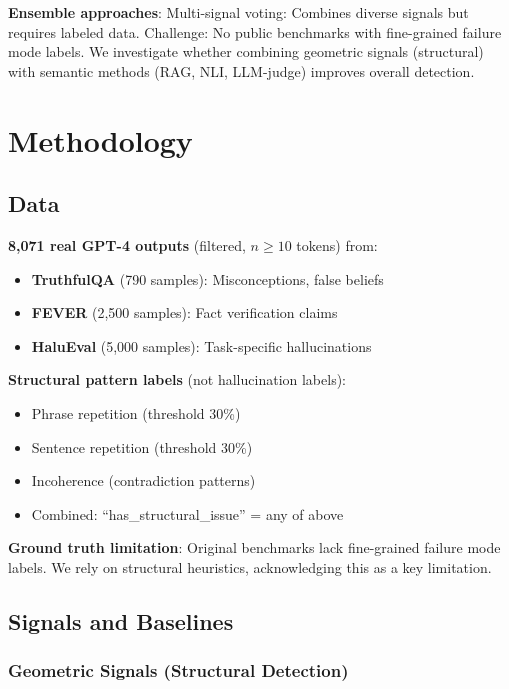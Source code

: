 \documentclass[11pt]{article}
\begin{document}
\textbf{Ensemble approaches}:
Multi-signal voting: Combines diverse signals but requires labeled data. Challenge: No public benchmarks with fine-grained failure mode labels. We investigate whether combining geometric signals (structural) with semantic methods (RAG, NLI, LLM-judge) improves overall detection.

\section{Methodology}
\label{sec:methodology}

\subsection{Data}

\textbf{8,071 real GPT-4 outputs} (filtered, $n \geq 10$ tokens) from:
\begin{itemize}
\item \textbf{TruthfulQA} (790 samples): Misconceptions, false beliefs
\item \textbf{FEVER} (2,500 samples): Fact verification claims
\item \textbf{HaluEval} (5,000 samples): Task-specific hallucinations
\end{itemize}

\textbf{Structural pattern labels} (not hallucination labels):
\begin{itemize}
\item Phrase repetition (threshold 30\%)
\item Sentence repetition (threshold 30\%)
\item Incoherence (contradiction patterns)
\item Combined: ``has\_structural\_issue'' = any of above
\end{itemize}

\textbf{Ground truth limitation}: Original benchmarks lack fine-grained failure mode labels. We rely on structural heuristics, acknowledging this as a key limitation.

\subsection{Signals and Baselines}

\subsubsection{Geometric Signals (Structural Detection)}
\end{document}

